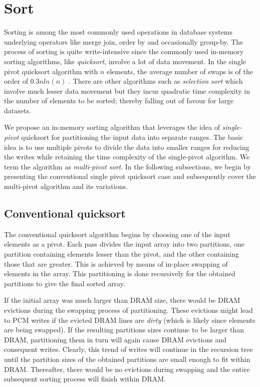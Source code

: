 \section{Sort}
\label{sort}

Sorting is among the most commonly used operations in database systems underlying operators like merge join, order by and occasionally group-by.  The process of sorting is quite write-intensive since the commonly used in-memory sorting algorithms, like \textit{quicksort}, involve a lot of data movement. In the single pivot quicksort algorithm with $n$ elements, the average number of swaps is of the order of $0.3nln(n)$ \cite{swaps}. There are other algorithms such as \textit{selection sort} which involve much lesser data movement but they incur quadratic time complexity in the number of elements to be sorted; thereby falling out of favour for large datasets.

We propose an in-memory sorting algorithm that leverages the idea of \textit{single-pivot} quicksort for partitioning the input data into separate ranges. The basic idea is to use multiple pivots to divide the data into smaller ranges for reducing the writes while retaining the time complexity of the single-pivot algorithm. We term the algorithm as \textit{multi-pivot sort}. In the following subsections, we begin by presenting the conventional single pivot quicksort case and subsequently cover the multi-pivot algorithm and its variations.

\subsection{Conventional quicksort}
The conventional quicksort algorithm begins by choosing one of the input elements as a pivot. Each pass divides the input array into two partitions, one partition containing elements lesser than the pivot, and the other containing those that are greater. This is achieved by means of in-place swapping of elements in the array. This partitioning is done recursively for the obtained partitions to give the final sorted array.

If the initial array was much larger than DRAM size, there would be DRAM evictions during the swapping process of partitioning. These evictions might lead to PCM writes if the evicted DRAM lines are \textit{dirty} (which is likely since elements are being swapped). If the resulting partitions sizes continue to be larger than DRAM, partitioning them in turn will again cause DRAM evictions and consequent writes. Clearly, this trend of writes will continue in the recursion tree until the partition sizes of the obtained partitions are small enough to fit within DRAM. Thereafter, there would be no evictions during swapping and the entire subsequent sorting process will finish within DRAM.

